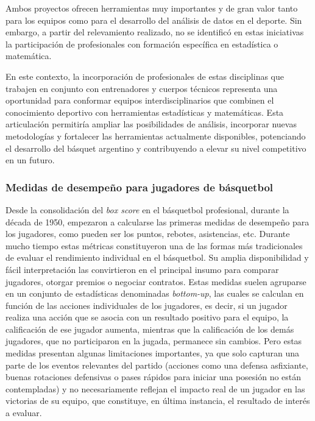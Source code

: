 \documentclass[
  12pt,
]{article}
\begin{document}
Ambos proyectos ofrecen herramientas muy importantes y de gran valor
tanto para los equipos como para el desarrollo del análisis de datos en
el deporte. Sin embargo, a partir del relevamiento realizado, no se
identificó en estas iniciativas la participación de profesionales con
formación específica en estadística o matemática.

En este contexto, la incorporación de profesionales de estas disciplinas
que trabajen en conjunto con entrenadores y cuerpos técnicos representa
una oportunidad para conformar equipos interdisciplinarios que combinen
el conocimiento deportivo con herramientas estadísticas y matemáticas.
Esta articulación permitiría ampliar las posibilidades de análisis,
incorporar nuevas metodologías y fortalecer las herramientas actualmente
disponibles, potenciando el desarrollo del básquet argentino y
contribuyendo a elevar su nivel competitivo en un futuro.

\subsubsection*{Medidas de desempeño para jugadores de
básquetbol}\label{medidas-de-desempeuxf1o-para-jugadores-de-buxe1squetbol}

Desde la consolidación del \emph{box score} en el básquetbol
profesional, durante la década de 1950, empezaron a calcularse las
primeras medidas de desempeño para los jugadores, como pueden ser los
puntos, rebotes, asistencias, etc. Durante mucho tiempo estas métricas
constituyeron una de las formas más tradicionales de evaluar el
rendimiento individual en el básquetbol. Su amplia disponibilidad y
fácil interpretación las convirtieron en el principal insumo para
comparar jugadores, otorgar premios o negociar contratos. Estas medidas
suelen agruparse en un conjunto de estadísticas denominadas
\emph{bottom-up}, las cuales se calculan en función de las acciones
individuales de los jugadores, es decir, si un jugador realiza una
acción que se asocia con un resultado positivo para el equipo, la
calificación de ese jugador aumenta, mientras que la calificación de los
demás jugadores, que no participaron en la jugada, permanece sin
cambios. Pero estas medidas presentan algunas limitaciones importantes,
ya que solo capturan una parte de los eventos relevantes del partido
(acciones como una defensa asfixiante, buenas rotaciones defensivas o
pases rápidos para iniciar una posesión no están contempladas) y no
necesariamente reflejan el impacto real de un jugador en las victorias
de su equipo, que constituye, en última instancia, el resultado de
interés a evaluar.
\end{document}
